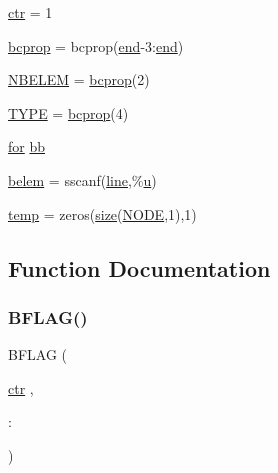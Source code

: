 \begin{DoxyCompactItemize}
\item 
\hyperlink{a00608_a7a8898e9362126201efe22332c961613}{ctr} = 1
\item 
\hyperlink{a00608_aeb3bba3f2a1cac40e67dcec5c4faf3d8}{bcprop} = bcprop(\hyperlink{a00608_afb358f48b1646c750fb9da6c6585be2b}{end}-\/3\+:\hyperlink{a00608_afb358f48b1646c750fb9da6c6585be2b}{end})
\item 
\hyperlink{a00608_a20507c612303aa48d9e49883e863fa60}{N\+B\+E\+L\+EM} = \hyperlink{a00608_aeb3bba3f2a1cac40e67dcec5c4faf3d8}{bcprop}(2)
\item 
\hyperlink{a00608_a0bc6723d5d4776ab7cdc646728b775f7}{T\+Y\+PE} = \hyperlink{a00608_aeb3bba3f2a1cac40e67dcec5c4faf3d8}{bcprop}(4)
\item 
\hyperlink{a00623_ad1e7380d51df1e0043d24d3c8a860e0a}{for} \hyperlink{a00608_af10d0cbe849959834570568849bc2290}{bb}
\item 
\hyperlink{a00608_abb20825a1a6ea12717847b56b3231c6a}{belem} = sscanf(\hyperlink{a00608_a1d1b0d42391bd99b4214d9216b163807}{line},\textquotesingle{}\%\hyperlink{a00605_a6277e2a7446059985dc9bcf0a4ac1a8f}{u}\textquotesingle{})
\item 
\hyperlink{a00608_a905c521e05ec8042631a912b71d0454e}{temp} = zeros(\hyperlink{a00611_ad6cb0afbbe6ea4f56407890be2533966}{size}(\hyperlink{a00605_a28010846a3742b3c2c07f00b1f1536ff}{N\+O\+DE},1),1)
\end{DoxyCompactItemize}


\subsection{Function Documentation}
\mbox{\label{a00608_a2631e3df74fb2c7ff87a8ab5c4dabd4b}} 
\subsubsection{\texorpdfstring{B\+F\+L\+A\+G()}{BFLAG()}}
{\footnotesize\ttfamily B\+F\+L\+AG (\begin{DoxyParamCaption}\item[{\hyperlink{a00608_a7a8898e9362126201efe22332c961613}{ctr}}]{,  }\item[{\+:}]{ }\end{DoxyParamCaption})}

\mbox{\label{a00608_a0493b72e01e669899778919fed741667}} 
